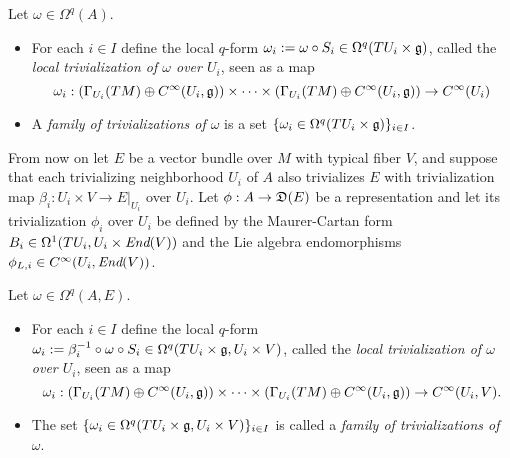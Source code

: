 \begin{definition}\label{definitionLocalTrivializationOfScalarValuedForms}
Let $\omega \in \Omega^q(A)$.
    \begin{itemize}
    
    \item For each $i \in I$ define the local $q$-form $\omega_i := \omega \circ S_i \in \Omega^q(TU_i\times \mathfrak{g})$, called the \emph{local trivialization of $\omega$ over $U_i$}, seen as a map
   $$
        \omega_i :\left( \Gamma_{U_i}(TM)\oplus C^\infty({U_i}, \mathfrak{g}) \right) \times \cdots \times \left( \Gamma_{U_i}(TM)\oplus C^\infty({U_i}, \mathfrak{g}) \right) \to C^\infty({U_i})
    $$
    
    \item A \emph{family of trivializations of $\omega$} is a set $\{\omega_i \in \Omega^q(TU_i \times \mathfrak{g})\}_{i \in I}$.
    
    \end{itemize}

\end{definition}

From now on let $E$ be a vector bundle over $M$ with typical fiber $V$, and suppose that each trivializing neighborhood $U_i$ of $A$ also trivializes $E$ with trivialization map $\beta_i: U_i \times V \to E|_{U_i}$ over $U_i$. Let $\phi:A \to \alg D(E)$ be a representation and let its trivialization $\phi_i$ over $U_i$ be defined by the Maurer-Cartan form $B_i \in \Omega^1(TU_i, U_i \times \operatorname{\textit{End}}(V))$ and the Lie algebra endomorphisms $\phi_{L,i} \in C^\infty(U_i, \End(V))$.

\begin{definition}\label{definitionLocalTrivializationOfEValuedForms}
Let $\omega \in \Omega^q(A, E)$.
    \begin{itemize}
    
    \item For each $i \in I$ define the local $q$-form $\omega_i:= \beta_i^{-1} \circ \omega \circ S_i  \in \Omega^q(TU_i\times \mathfrak{g}, {U_i} \times V)$, called the \emph{local trivialization of $\omega$ over $U_i$}, seen as a map
    $$
        \omega_i :\left( \Gamma_{U_i}(TM)\oplus C^\infty({U_i}, \mathfrak{g}) \right) \times \cdots \times \left( \Gamma_{U_i}(TM)\oplus C^\infty({U_i}, \mathfrak{g}) \right) \to C^\infty({U_i}, V).
    $$
    
    \item The set $\{\omega_i \in \Omega^q(TU_i\times \mathfrak{g}, U_i \times V)\}_{i \in I}$ is called a \emph{family of trivializations of $\omega$}.
    
    \end{itemize}

\end{definition}

